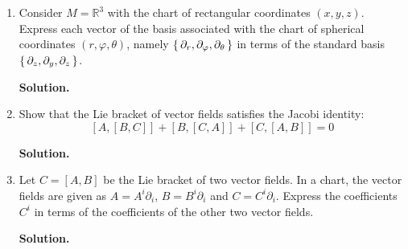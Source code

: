 \documentclass[11pt]{article}
\begin{document}
\begin{enumerate}[start=1,label={\bfseries Exercise \arabic*:},leftmargin=1in]
    \item Consider \(M = \mathbb{R}^3\) with the chart of rectangular coordinates \((x,y,z)\). Express each vector of the basis associated with the chart of spherical coordinates \((r, \varphi, \theta)\), namely \(\set{\partial_r, \partial_{\varphi}, \partial_{\theta}}\) in terms of the standard basis \(\set{\partial_z, \partial_y, \partial_z}\).

        \textbf{Solution.}

    \item Show that the Lie bracket of vector fields satisfies the Jacobi identity: \[ [A, [B, C]] + [B, [C, A]] + [C, [A, B]] = 0  \]

        \textbf{Solution.}

    \item Let \(C = [A, B]\) be the Lie bracket of two vector fields. In a chart, the vector fields are given as \(A = A^i \partial_i\), \(B = B^i \partial_i\) and \(C = C^i \partial_i\). Express the coefficients \(C^i\) in terms of the coefficients of the other two vector fields.

        \textbf{Solution.}


\end{enumerate}
\end{document}
